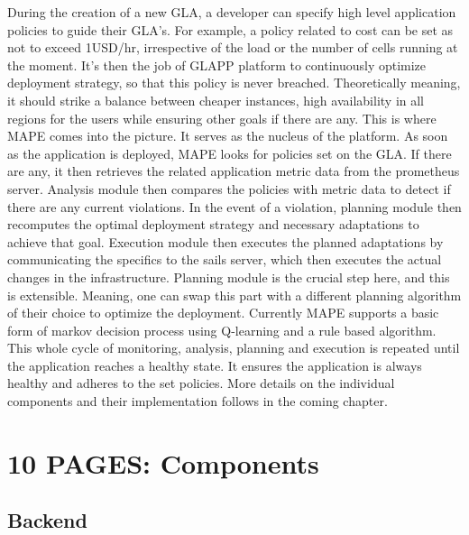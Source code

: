 \documentclass{seal_thesis}
\begin{document}
During the creation of a new GLA, a developer can specify high level application policies to guide their GLA's. 
For example, a policy related to cost can be set as not to exceed 1USD/hr, irrespective of the load or the number of cells running at the moment. 
It's then the job of GLAPP platform to continuously optimize deployment strategy, so that this policy is never breached. 
Theoretically meaning, it should strike a balance between cheaper instances, high availability in all regions for the users while ensuring other goals if there are any. 
This is where MAPE comes into the picture. 
It serves as the nucleus of the platform. 
As soon as the application is deployed, MAPE looks for policies set on the GLA. 
If there are any, it then retrieves the related application metric data from the prometheus server. 
Analysis module then compares the policies with metric data to detect if there are any current violations. 
In the event of a violation, planning module then recomputes the optimal deployment strategy and necessary adaptations to achieve that goal. 
Execution module then executes the planned adaptations by communicating the specifics to the sails server, which then executes the actual changes in the infrastructure. 
Planning module is the crucial step here, and this is extensible. 
Meaning, one can swap this part with a different planning algorithm of their choice to optimize the deployment. 
Currently MAPE supports a basic form of markov decision process using Q-learning and a rule based algorithm. 
This whole cycle of monitoring, analysis, planning and execution is repeated until the application reaches a healthy state. 
It ensures the application is always healthy and adheres to the set policies. 
More details on the individual components and their implementation follows in the coming chapter.


\chapter{10 PAGES: Components}\label{ch:components}

\section{Backend}
\end{document}
